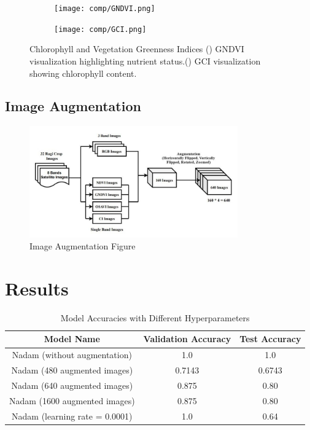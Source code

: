 \documentclass{article}
\begin{document}
\begin{figure}[h]
    \centering
    \begin{subfigure}{0.4\textwidth}
        \texttt{[image: comp/GNDVI.png]}
        \caption{\label{fig:2a}}
    \end{subfigure}
    \begin{subfigure}{0.4\textwidth}
        \texttt{[image: comp/GCI.png]}
        \caption{\label{fig:2b}}
    \end{subfigure}
    \caption{Chlorophyll and Vegetation Greenness Indices   () GNDVI visualization highlighting nutrient status.() GCI visualization showing chlorophyll content.}
    \label{fig:2}
\end{figure}
\subsection*{Image Augmentation }
\begin{figure}[h]
    \centering
    \includegraphics[width=0.8\textwidth]{figures/Image Augmentation Figure.jpeg}
    \caption{Image Augmentation Figure}
    \label{fig:1}
\end{figure}
\FloatBarrier

\section{Results}

\begin{table}[b]
    \caption{Model Accuracies with Different Hyperparameters}    
    \centering
    \begin{tabular}{ccc}
        \hline
        \textbf{Model Name} & \textbf{Validation Accuracy} & \textbf{Test Accuracy} \\  
        \hline
        Nadam (without augmentation) & 1.0 & 1.0 \\ 
        Nadam (480 augmented images) & 0.7143 & 0.6743 \\
        Nadam (640 augmented images) & 0.875 & 0.80 \\
        Nadam (1600 augmented images) & 0.875 & 0.80 \\
        Nadam (learning rate = 0.0001) & 1.0 & 0.64 \\ 
        \hline
    \end{tabular}
    \label{tab:nadam_accuracies}
\end{table}
\end{document}
